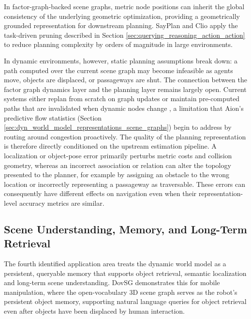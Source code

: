  In factor-graph-backed scene graphs, metric node positions can inherit the global consistency of the underlying geometric optimization, providing a geometrically grounded representation for downstream planning.  
SayPlan \cite{rana2023sayplangroundinglargelanguage} and Clio \cite{maggio_clio_2024} apply the task-driven pruning described in Section \ref{sec:querying_reasoning_action_action} to reduce planning complexity by orders of magnitude in large environments. %

In dynamic environments, however, static planning assumptions break down: a path computed over the current scene graph may become infeasible as agents move, objects are displaced, or passageways are shut. 
The connection between the factor graph dynamics layer and the planning layer remains largely open. 
Current systems either replan from scratch on graph updates or maintain pre-computed paths that are invalidated when dynamic nodes change \cite{ejaz2025situationallyawarepathplanningexploiting}, a limitation that Aion's predictive flow statistics (Section \ref{sec:dyn_world_model_representations_scene_graphs}) begin to address by routing around congestion proactively\cite{catalano_aion_2025}.
The quality of the planning representation is therefore directly conditioned on the upstream estimation pipeline.
A localization or object-pose error primarily perturbs metric costs and collision geometry, whereas an incorrect association or relation can alter the topology presented to the planner, for example by assigning an obstacle to the wrong location or incorrectly representing a passageway as traversable.
These errors can consequently have different effects on navigation even when their representation-level accuracy metrics are similar.

\subsection{Scene Understanding, Memory, and Long-Term Retrieval}\label{sec:applications_scene_understanding}
The fourth identified application area treats the dynamic world model as a persistent, queryable memory that supports object retrieval, semantic localization and long-term scene understanding.
DovSG \cite{yan_dynamic_2025} demonstrates this for mobile manipulation, where the open-vocabulary 3D scene graph serves as the robot's persistent object memory, supporting natural language queries for object retrieval even after objects have been displaced by human interaction. %

